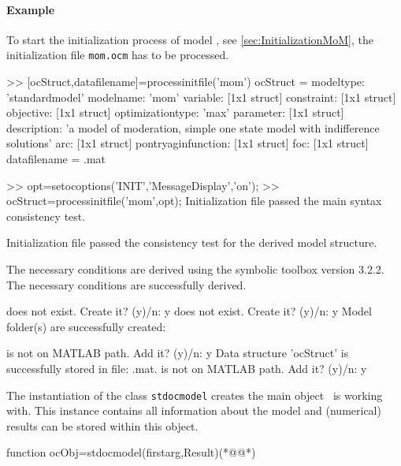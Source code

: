 \paragraph{Example}
To start the initialization process of model \MoM, see \cref{sec:InitializationMoM}, the initialization file \lstinline+mom.ocm+ has to be processed.
\begin{matlab}
>> [ocStruct,datafilename]=processinitfile('mom')
ocStruct = 
             modeltype: 'standardmodel'
             modelname: 'mom'
              variable: [1x1 struct]
            constraint: [1x1 struct]
             objective: [1x1 struct]
      optimizationtype: 'max'
             parameter: [1x1 struct]
           description: {'a model of moderation, simple one state model with indifference solutions'}
                   arc: [1x1 struct]
    pontryaginfunction: [1x1 struct]
                   foc: [1x1 struct]
datafilename =
\ocmat\model\usermodel\mom\data\momModelDataStructure.mat

>> opt=setocoptions('INIT','MessageDisplay','on');
>> ocStruct=processinitfile('mom',opt);
Initialization file passed the main syntax consistency test.

Initialization file passed the consistency test for the derived model structure.

The necessary conditions are derived using the symbolic toolbox version 3.2.2.
The necessary conditions are successfully derived.

\ocmat\model\usermodel\mom does not exist. Create it?  (y)/n: y
\ocmat\model\usermodel\mom\data does not exist. Create it?  (y)/n: y
Model folder(s) are successfully created:
\ocmat\model\usermodel\mom
\ocmat\model\usermodel\mom\data

\ocmat\model\usermodel\mom\data is not on MATLAB path. Add it?  (y)/n: y
Data structure 'ocStruct' is successfully stored in file:
\ocmat\model\usermodel\mom\data\momModelDataStructure.mat.
\ocmat\model\usermodel\mom is not on MATLAB path. Add it?  (y)/n: y
\end{matlab}
The instantiation of the class \lstinline+stdocmodel+ creates the main object \OCMAT\ is working with. This instance contains all information about the model and (numerical) results can be stored within this object.
\begin{matlab}
function ocObj=stdocmodel(firstarg,Result)(*@\label{cmd:stdocmodel}@*)
%
%
%
%
%
%
\end{matlab}

